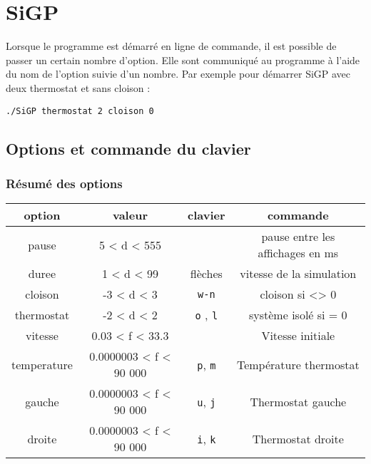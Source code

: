 %
\section{SiGP}
%
%
Lorsque le programme est démarré en ligne de commande, il est possible de passer un certain nombre d'option. Elle sont communiqué au programme à l'aide du nom de l'option suivie d'un nombre. Par exemple pour démarrer SiGP avec deux thermostat et sans cloison :
%
\begin{center}
\texttt{./SiGP thermostat 2 cloison 0}
\end{center}
%
\subsection{Options et commande du clavier}
%
\subsubsection{Résumé des options}
\begin{center}
\begin{tabular}{cccc}
option & valeur & clavier & commande \\
\hline
pause & 5 < d < 555 &  & pause entre les affichages en ms \\
duree & 1 < d < 99 & flèches & vitesse de la simulation \\
cloison & -3 < d < 3 & \texttt{w-n} & cloison si <> 0 \\
thermostat & -2 < d < 2 & \texttt{o} , \texttt{l} & système isolé si = 0 \\
vitesse & 0.03 < f < 33.3 &  & Vitesse initiale \\
temperature & 0.0000003 < f < 90 000 & \texttt{p}, \texttt{m} & Température thermostat \\
gauche & 0.0000003 < f < 90 000 & \texttt{u}, \texttt{j} & Thermostat gauche \\
droite & 0.0000003 < f < 90 000 & \texttt{i}, \texttt{k} & Thermostat droite \\
\end{tabular}
\end{center}
%
